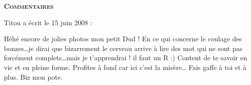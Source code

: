 \bigskip
\textbf{\textsc{Commentaires}}

\medskip
Titou a écrit le 15 juin 2008 :
\begin{displayquote}
Héhé encore de jolies photos mon petit Dud !
En ce qui concerne le coulage des bonzes\dots je dirai que bizarrement le cerveau arrive à lire des mot qui ne sont pas forcément complets\dots mais je t'apprendrai ! il faut un R :) Content de te savoir en vie et en pleine forme. Profites à fond car ici c'est la misère\dots
Fais gaffe à toi et à plus.
Biz mon pote.
\end{displayquote}

\vfill
